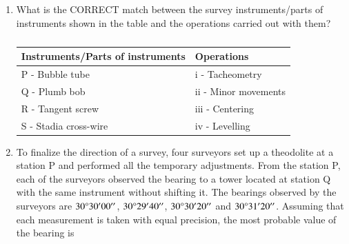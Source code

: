 \documentclass[journal,12pt,onecolumn]{article}
\theoremstyle{remark}
\begin{document}
\begin{enumerate}
    \item What is the CORRECT match between the survey instruments/parts of instruments
    shown in the table and the operations carried out with them?
    \begin{table}[H]
        \centering
        \begin{tabular}{|l|l|}
        \hline
        \textbf{Instruments/Parts of instruments} & \textbf{Operations} \\ \hline
        P - Bubble tube & i - Tacheometry \\
        Q - Plumb bob & ii - Minor movements \\
        R - Tangent screw & iii - Centering \\
        S - Stadia cross-wire & iv - Levelling \\ \hline
        \end{tabular}
        \caption{}
        \label{tab:q31}
    \end{table}

    \hfill{}
    \begin{enumerate}
    \end{enumerate}
    
    \item To finalize the direction of a survey, four surveyors set up a theodolite at a station
    P and performed all the temporary adjustments. From the station P, each of the
    surveyors observed the bearing to a tower located at station Q with the same
    instrument without shifting it. The bearings observed by the surveyors are
    $30\degree 30' 00''$, $30\degree 29' 40''$, $30\degree 30' 20''$ and $30\degree 31' 20''$. Assuming that
    each measurement is taken with equal precision, the most probable value of the
    bearing is
    
    \hfill{}
    \begin{enumerate}
    \end{enumerate}


\end{enumerate}
\end{document}
